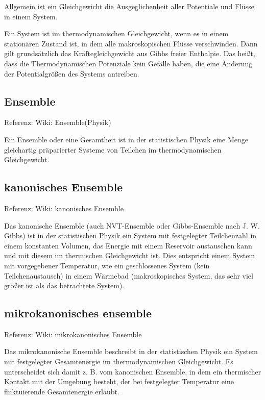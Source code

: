\documentclass[]{article}
\begin{document}
Allgemein ist ein Gleichgewicht die Ausgeglichenheit aller Potentiale und Flüsse in einem System.
 
Ein System ist im thermodynamischen Gleichgewicht, wenn es in einem stationären Zustand ist, in dem alle makroskopischen Flüsse verschwinden. Dann gilt grundsätzlich das Kräftegleichgewicht aus Gibbs freier Enthalpie. Das heißt, dass die Thermodynamischen Potenziale kein Gefälle haben, die eine Änderung der Potentialgrößen des Systems antreiben.


\subsection{Ensemble}
Referenz: Wiki: Ensemble(Physik) 

Ein Ensemble oder eine Gesamtheit ist in der statistischen Physik eine Menge gleichartig präparierter Systeme von Teilchen im thermodynamischen Gleichgewicht. 

\subsection{kanonisches Ensemble}
Referenz: Wiki: kanonisches Ensemble

Das kanonische Ensemble (auch NVT-Ensemble oder Gibbs-Ensemble nach J. W. Gibbs) ist in der statistischen Physik ein System mit festgelegter Teilchenzahl in einem konstanten Volumen, das Energie mit einem Reservoir austauschen kann und mit diesem im thermischen Gleichgewicht ist. Dies entspricht einem System mit vorgegebener Temperatur, wie ein geschlossenes System (kein Teilchenaustausch) in einem Wärmebad (makroskopisches System, das sehr viel größer ist als das betrachtete System).

\subsection{mikrokanonisches ensemble}
Referenz: Wiki: mikrokanonisches Ensemble

Das mikrokanonische Ensemble beschreibt in der statistischen Physik ein System mit festgelegter Gesamtenergie im thermodynamischen Gleichgewicht. Es unterscheidet sich damit z. B. vom kanonischen Ensemble, in dem ein thermischer Kontakt mit der Umgebung besteht, der bei festgelegter Temperatur eine fluktuierende Gesamtenergie erlaubt.
\end{document}
